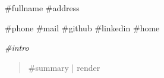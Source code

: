 \begin{multicols}{2}

  \header
  {#{fullname}}
  {#{address}}

  \medskip

  \info
  {#{phone}}
  {#{mail}}
  {#{github}}
  {#{linkedin}}
  {#{home}}

  \vfill

  {
  \itshape
  #{intro}
  }

  \columnbreak

  \begin{abstract}
    #{summary | render}
  \end{abstract}


\end{multicols}
